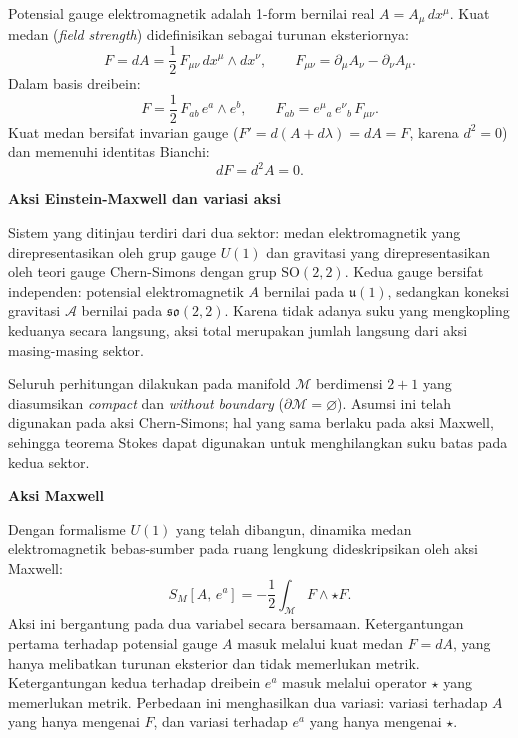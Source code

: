 Potensial gauge elektromagnetik adalah 1-form bernilai real $A = A_\mu\,dx^\mu$. Kuat medan (\textit{field strength}) didefinisikan sebagai turunan eksteriornya:
\begin{equation}\label{em43-eq:kuat-medan-U1}
    F = dA = \frac{1}{2}\,F_{\mu\nu}\,dx^\mu \wedge dx^\nu, \qquad F_{\mu\nu} = \partial_\mu A_\nu - \partial_\nu A_\mu.
\end{equation}
Dalam basis dreibein:
\begin{equation}\label{em43-eq:F-dreibein}
    F = \frac{1}{2}\,F_{ab}\,e^a \wedge e^b, \qquad F_{ab} = e^\mu{}_a\,e^\nu{}_b\,F_{\mu\nu}.
\end{equation}
Kuat medan bersifat invarian gauge ($F' = d(A + d\lambda) = dA = F$, karena $d^2 = 0$) dan memenuhi identitas Bianchi:
\begin{equation}\label{em43-eq:bianchi}
    dF = d^2A = 0.
\end{equation}

\vspace{0.5em}
\noindent \textbf{Aksi Einstein-Maxwell dan variasi aksi}

\label{em43-sec:formulasi-aksi}

Sistem yang ditinjau terdiri dari dua sektor: medan elektromagnetik yang direpresentasikan oleh grup gauge $U(1)$ dan gravitasi yang direpresentasikan oleh teori gauge Chern-Simons dengan grup $\mathrm{SO}(2,2)$. Kedua gauge bersifat independen: potensial elektromagnetik $A$ bernilai pada $\mathfrak{u}(1)$, sedangkan koneksi gravitasi $\mathcal{A}$ bernilai pada $\mathfrak{so}(2,2)$. Karena tidak adanya suku yang mengkopling keduanya secara langsung, aksi total merupakan jumlah langsung dari aksi masing-masing sektor.

Seluruh perhitungan dilakukan pada manifold $\mathcal{M}$ berdimensi $2+1$ yang diasumsikan \emph{compact} dan \emph{without boundary} ($\partial\mathcal{M} = \varnothing$). Asumsi ini telah digunakan pada aksi Chern-Simons; hal yang sama berlaku pada aksi Maxwell, sehingga teorema Stokes dapat digunakan untuk menghilangkan suku batas pada kedua sektor.

\vspace{0.5em}
\noindent \textbf{Aksi Maxwell}

Dengan formalisme $U(1)$ yang telah dibangun, dinamika medan elektromagnetik bebas-sumber pada ruang lengkung dideskripsikan oleh aksi Maxwell:
\begin{equation}\label{em43-eq:aksi-maxwell}
    S_{M}[A,\, e^{a}] = -\frac{1}{2} \int_{\mathcal{M}} F \wedge \star F.
\end{equation}
Aksi ini bergantung pada dua variabel secara bersamaan. Ketergantungan pertama terhadap potensial gauge $A$ masuk melalui kuat medan $F = dA$, yang hanya melibatkan turunan eksterior dan tidak memerlukan metrik. Ketergantungan kedua terhadap dreibein $e^{a}$ masuk melalui operator $\star$ yang memerlukan metrik. Perbedaan ini menghasilkan dua variasi: variasi terhadap $A$ yang hanya mengenai $F$, dan variasi terhadap $e^{a}$ yang hanya mengenai $\star$.


